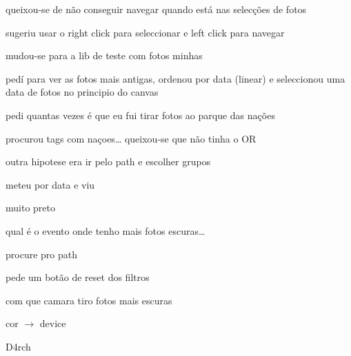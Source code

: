 \begin{myitemize}
	\item queixou-se de não conseguir navegar quando está nas selecções de fotos

	\item sugeriu usar o right click para seleccionar e left click para navegar


	\item mudou-se para a lib de teste com fotos minhas

	\item pedí para ver as fotos mais antigas, ordenou por data (linear) e seleccionou uma data de fotos no principio do canvas


	\item pedi quantas vezes é que eu fui tirar fotos ao parque das nações

	\item procurou tags com naçoes… queixou-se que não tinha o OR 

	\item outra hipotese era ir pelo path e escolher grupos

	\item meteu por data e viu


	\item muito preto


	\item qual é o evento onde tenho mais fotos escuras…

	\item procure pro path


	\item pede um botão de reset dos filtros


	\item com que camara tiro fotos mais escuras

	\item cor $\rightarrow$ device

\end{myitemize}



D4rch

